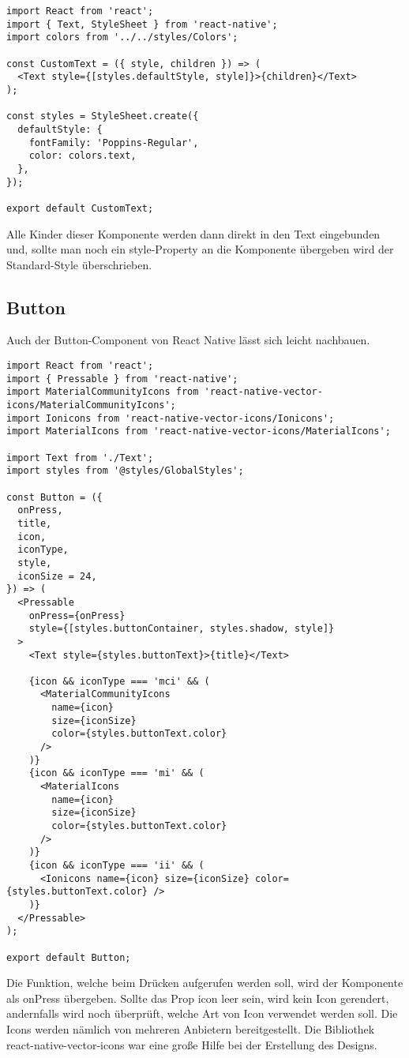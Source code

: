 \begin{lstlisting}
import React from 'react';
import { Text, StyleSheet } from 'react-native';
import colors from '../../styles/Colors';

const CustomText = ({ style, children }) => (
  <Text style={[styles.defaultStyle, style]}>{children}</Text>
);

const styles = StyleSheet.create({
  defaultStyle: {
    fontFamily: 'Poppins-Regular',
    color: colors.text,
  },
});

export default CustomText;
\end{lstlisting}

Alle Kinder dieser Komponente werden dann direkt in den Text eingebunden und, sollte man noch ein
style-Property an die Komponente übergeben wird der Standard-Style überschrieben.

\newpage
\subsection{Button}
Auch der Button-Component von React Native lässt sich leicht nachbauen.

\begin{lstlisting}
import React from 'react';
import { Pressable } from 'react-native';
import MaterialCommunityIcons from 'react-native-vector-icons/MaterialCommunityIcons';
import Ionicons from 'react-native-vector-icons/Ionicons';
import MaterialIcons from 'react-native-vector-icons/MaterialIcons';

import Text from './Text';
import styles from '@styles/GlobalStyles';

const Button = ({
  onPress,
  title,
  icon,
  iconType,
  style,
  iconSize = 24,
}) => (
  <Pressable
    onPress={onPress}
    style={[styles.buttonContainer, styles.shadow, style]}
  >
    <Text style={styles.buttonText}>{title}</Text>

    {icon && iconType === 'mci' && (
      <MaterialCommunityIcons
        name={icon}
        size={iconSize}
        color={styles.buttonText.color}
      />
    )}
    {icon && iconType === 'mi' && (
      <MaterialIcons
        name={icon}
        size={iconSize}
        color={styles.buttonText.color}
      />
    )}
    {icon && iconType === 'ii' && (
      <Ionicons name={icon} size={iconSize} color={styles.buttonText.color} />
    )}
  </Pressable>
);

export default Button;
\end{lstlisting}

Die Funktion, welche beim Drücken aufgerufen werden soll, wird der Komponente als onPress übergeben.
Sollte das Prop icon leer sein, wird kein Icon gerendert, andernfalls wird noch überprüft, welche
Art von Icon verwendet werden soll. Die Icons werden nämlich von mehreren Anbietern bereitgestellt.
Die Bibliothek react-native-vector-icons war eine große Hilfe bei der Erstellung des Designs.


